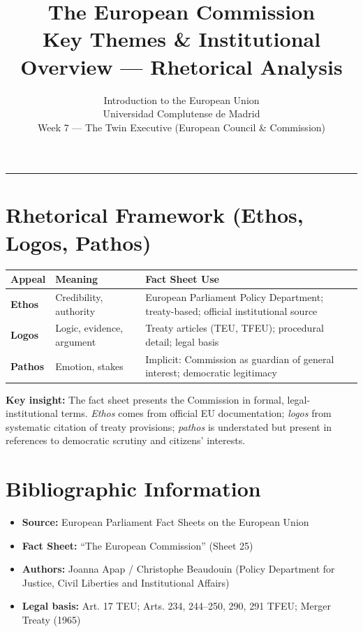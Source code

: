 \documentclass[11pt,a4paper]{article}
\begin{document}
\title{The European Commission\\Key Themes \& Institutional Overview --- Rhetorical Analysis}
\author{Introduction to the European Union\\Universidad Complutense de Madrid\\Week 7 --- The Twin Executive (European Council \& Commission)}
\date{}
\maketitle
\vspace{-1em}
\hrule
\vspace{1em}

\section*{Rhetorical Framework (Ethos, Logos, Pathos)}

\begin{table}[h]
\centering
\begin{tabular}{@{}lll@{}}
\toprule
\textbf{Appeal} & \textbf{Meaning} & \textbf{Fact Sheet Use} \\
\midrule
\textbf{Ethos} & Credibility, authority & European Parliament Policy Department; treaty-based; official institutional source \\
\textbf{Logos} & Logic, evidence, argument & Treaty articles (TEU, TFEU); procedural detail; legal basis \\
\textbf{Pathos} & Emotion, stakes & Implicit: Commission as guardian of general interest; democratic legitimacy \\
\bottomrule
\end{tabular}
\end{table}

\textbf{Key insight:} The fact sheet presents the Commission in formal, legal-institutional terms. \textit{Ethos} comes from official EU documentation; \textit{logos} from systematic citation of treaty provisions; \textit{pathos} is understated but present in references to democratic scrutiny and citizens' interests.

\section*{Bibliographic Information}

\begin{itemize}
\item \textbf{Source:} European Parliament Fact Sheets on the European Union
\item \textbf{Fact Sheet:} ``The European Commission'' (Sheet 25)
\item \textbf{Authors:} Joanna Apap / Christophe Beaudouin (Policy Department for Justice, Civil Liberties and Institutional Affairs)
\item \textbf{Legal basis:} Art. 17 TEU; Arts. 234, 244--250, 290, 291 TFEU; Merger Treaty (1965)
\end{itemize}
\end{document}
